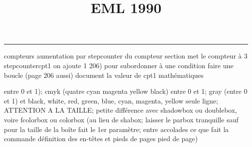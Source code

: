 \documentclass[11pt]{article}%
\title{\bf \vspace{-2cm} EML 1990} %
\author{} %
\date{} %
\renewcommand{\headrulewidth}{0pt}%
\renewcommand{\footrulewidth}{0.4pt}%
\begin{document}
\maketitle %
\vspace{-1.4cm}\hrule %
\thispagestyle{fancy}

\vspace*{.2cm}



compteurs%
aumentation par stepcounter du compteur section%
met le compteur à 3%
stepcounter{cpt1} on ajoute 1%
206) pour subordonner à une condition %
faire une boucle (page 206 aussi) %
document la valeur de cpt1 
mathématiques\newcommand{\ch}{\operatorname{ch}} 
\newcommand{\sh}{\operatorname{sh}}
\renewcommand{\tanh}{\operatorname{th}}
\renewcommand{\sinh}{\operatorname{sh}}
\renewcommand{\cosh}{\operatorname{ch}}
\newcommand{\argsh}{\operatorname{argsh}}
\newcommand{\argch}{\operatorname{argch}}
\newcommand{\argth}{\operatorname{argth}}
\newcommand{\ker}{\operatorname{Ker}}
\renewcommand{\im}{\operatorname{Im}}
\newcommand{\rg}{\operatorname{rg}}
\newcommand{\Id}{\operatorname{Id}}
\newcommand{\id}{\operatorname{id}}
\renewcommand{\leq}{\leq}
\renewcommand{\geq}{\geq }

entre 0 et 1); cmyk (quatre cyan magenta yellow black) entre 0 et 1;
gray (entre 0 et 1) et black, white, red, green, blue, cyan, magenta,
yellow%
seule ligne; ATTENTION A LA TAILLE; petite différence avec shadowbox ou
doublebox, voire fcolorbox ou colorbox (au lieu de shabox; laisser le
parbox tranquille sauf pour la taille de la boîte
\newcommand{\Tbox}[1]{\begin{center} \shabox{\parbox{0.6
\linewidth}{#1}} \end{center}} %
fait le 1er paramètre; entre accolades ce que fait la commande
définition des en-têtes et pieds de pages\pagestyle{fancy}
\chead{}
\rfoot[ \ \thepage]{\thepage}
\cfoot{}
\lfoot{}
\thispagestyle{fancy} %
pied de page)\renewcommand{\footrulewidth}{0.4pt}
\renewcommand{\headrulewidth}{0.4pt}
\end{document}
